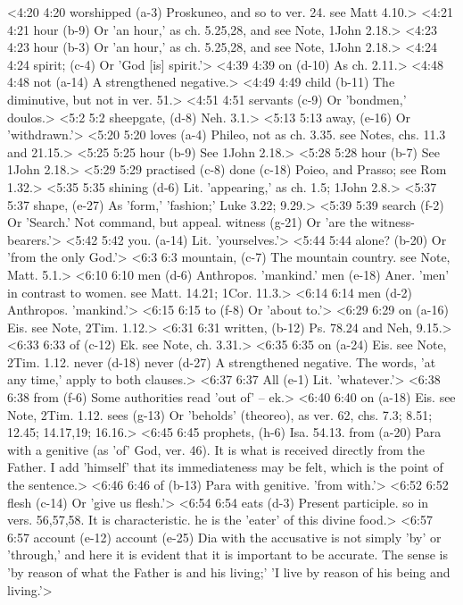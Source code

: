 <4:20 4:20  worshipped (a-3)  Proskuneo, and so to ver. 24. see Matt 4.10.>
<4:21 4:21  hour (b-9) Or 'an hour,' as ch. 5.25,28, and see Note, 1John 2.18.>
<4:23 4:23  hour (b-3)  Or 'an hour,' as ch. 5.25,28, and see Note, 1John 2.18.>
<4:24 4:24  spirit; (c-4)  Or 'God [is] spirit.'>
<4:39 4:39  on (d-10)  As ch. 2.11.>
<4:48 4:48  not (a-14)  A strengthened negative.>
<4:49 4:49  child (b-11)  The diminutive, but not in ver. 51.>
<4:51 4:51  servants (c-9)  Or 'bondmen,' doulos.>
<5:2 5:2  sheepgate, (d-8)  Neh. 3.1.>
<5:13 5:13  away, (e-16)  Or 'withdrawn.'>
<5:20 5:20  loves (a-4)  Phileo, not as ch. 3.35. see Notes, chs. 11.3 and 21.15.>
<5:25 5:25  hour (b-9) See 1John 2.18.>
<5:28 5:28  hour (b-7)  See 1John 2.18.>
<5:29 5:29  practised (c-8)  done (c-18)
  Poieo, and Prasso; see Rom 1.32.>
<5:35 5:35  shining (d-6)  Lit. 'appearing,' as ch. 1.5; 1John 2.8.>
<5:37 5:37  shape, (e-27)  As 'form,' 'fashion;' Luke 3.22; 9.29.>
<5:39 5:39  search (f-2)  Or 'Search.' Not command, but appeal.
  witness (g-21)  Or 'are the witness-bearers.'>
<5:42 5:42  you. (a-14)  Lit. 'yourselves.'>
<5:44 5:44  alone? (b-20)  Or 'from the only God.'>
<6:3 6:3  mountain, (c-7)  The mountain country. see Note, Matt. 5.1.>
<6:10 6:10  men (d-6)  Anthropos. 'mankind.'
  men (e-18)  Aner. 'men' in contrast to women. see Matt. 14.21; 1Cor. 11.3.>
<6:14 6:14  men (d-2)  Anthropos. 'mankind.'>
<6:15 6:15  to (f-8)  Or 'about to.'>
<6:29 6:29  on (a-16)  Eis. see Note, 2Tim. 1.12.>
<6:31 6:31  written, (b-12)  Ps. 78.24 and Neh, 9.15.>
<6:33 6:33  of (c-12)  Ek. see Note, ch. 3.31.>
<6:35 6:35  on (a-24)   Eis. see Note, 2Tim. 1.12.
  never (d-18)  never (d-27)
  A strengthened negative. The words, 'at any time,' apply to  both clauses.>
<6:37 6:37  All (e-1)  Lit. 'whatever.'>
<6:38 6:38  from (f-6)  Some authorities read 'out of' -- ek.>
<6:40 6:40  on (a-18)  Eis. see Note, 2Tim. 1.12.
  sees (g-13)  Or 'beholds' (theoreo), as ver. 62, chs. 7.3; 8.51; 12.45; 14.17,19; 16.16.>
<6:45 6:45  prophets, (h-6)  Isa. 54.13.
  from (a-20)  Para with a genitive (as 'of' God, ver. 46). It is what is  received directly from the Father. I add 'himself' that its  immediateness may be felt, which is the point of the sentence.>
<6:46 6:46  of (b-13)  Para with genitive. 'from with.'>
<6:52 6:52  flesh (c-14)  Or 'give us flesh.'>
<6:54 6:54  eats (d-3)  Present participle. so in vers. 56,57,58. It is  characteristic. he is the 'eater' of this divine food.>
<6:57 6:57  account (e-12)  account (e-25)
  Dia with the accusative is not simply 'by' or 'through,'  and here it is evident that it is important to be accurate. The  sense is 'by reason of what the Father is and his living;' 'I  live by reason of his being and living.'>
